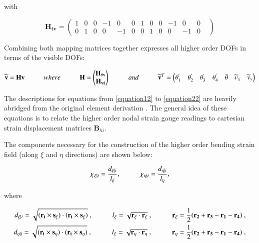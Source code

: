 with

\begin{equation} 
\mathbf{H_{tv}} =
\begin{pmatrix}
1 & 0 & 0 & -1 & 0 & 0 & 1 & 0 & 0 & -1 & 0 & 0 \\
0 & 1 & 0 & 0 & -1 & 0 & 0 & 1 & 0 & 0 & -1 & 0 & 
\end{pmatrix}
\label{equation10}
\end{equation}

Combining both mapping matrices together expresses all higher order DOFs in terms of the visible DOFs:

\begin{equation} 
\widetilde{\mathbf{v}} = \mathbf{H v}
\hspace{10mm}
where
\hspace{10mm}
\mathbf{H} =
\begin{pmatrix}
\mathbf{H_{\theta v}} \\
\mathbf{H_{vt}}
\end{pmatrix}
\hspace{10mm}
and
\hspace{10mm}
\widetilde{\mathbf{v}}^T = 
\begin{pmatrix}
\theta_1^{'} & \theta_2^{'} & \theta_3^{'} & \theta_4^{'} & \bar{\theta} &  \widetilde{v}_x & \widetilde{v}_y
\end{pmatrix}
\label{equation11}
\end{equation}

The descriptions for equations from \eqref{equation12} to \eqref{equation22} are heavily abridged from the original element derivation \cite{Hau94}. The general idea of these equations is to relate the higher order nodal strain gauge readings to cartesian strain displacement matrices $\mathbf{B}_{hi}$.

The components necessary for the construction of the higher order bending strain field (along $\xi$ and $\eta$ directions) are shown below:

\begin{equation} 
\chi_{\xi | i} = \frac{d_{\xi | i}}{l_\xi},
\hspace{10mm}
\chi_{\eta | i} = \frac{d_{\eta | i}}{l_\eta},
\label{equation12}
\end{equation}

where

\begin{align*} 
	d_{\xi | i} = \sqrt{(\mathbf{r_i} \times \mathbf{s_\xi}) \cdot (\mathbf{r_i} \times \mathbf{s_\xi})}\ ,
	\hspace{10mm}
	l_\xi = \sqrt{\mathbf{r_\xi} \cdot \mathbf{r_\xi}}\ ,
	\hspace{10mm} 
	\mathbf{r_\xi} = \frac{1}{2} ( \mathbf{r_2} + \mathbf{r_3} - \mathbf{r_1} - \mathbf{r_4} )\ , \\
	d_{\eta | i} = \sqrt{(\mathbf{r_i} \times \mathbf{s_\eta}) \cdot (\mathbf{r_i} \times \mathbf{s_\eta})}\ ,
	\hspace{10mm}
	l_\xi = \sqrt{\mathbf{r_\eta} \cdot \mathbf{r_\eta}}\ ,
	\hspace{10mm}
	\mathbf{r_\eta} = \frac{1}{2} ( \mathbf{r_2} + \mathbf{r_3} - \mathbf{r_1} - \mathbf{r_4} )\ ,
\end{align*}

